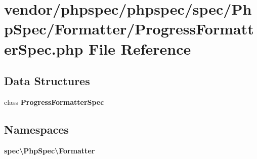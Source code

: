 \section{vendor/phpspec/phpspec/spec/\+Php\+Spec/\+Formatter/\+Progress\+Formatter\+Spec.php File Reference}
\label{_progress_formatter_spec_8php}
\subsection*{Data Structures}
\begin{DoxyCompactItemize}
\item 
class {\bf Progress\+Formatter\+Spec}
\end{DoxyCompactItemize}
\subsection*{Namespaces}
\begin{DoxyCompactItemize}
\item 
 {\bf spec\textbackslash{}\+Php\+Spec\textbackslash{}\+Formatter}
\end{DoxyCompactItemize}
